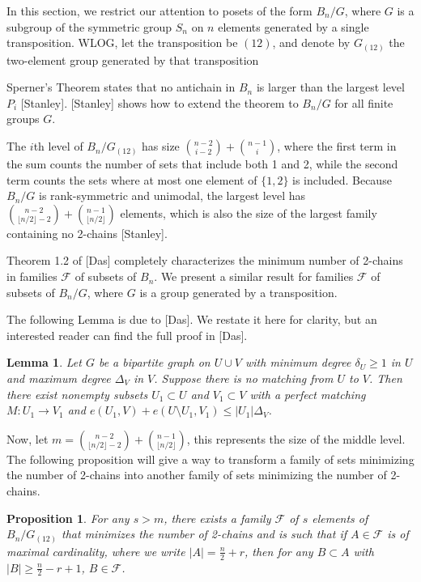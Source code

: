 \documentclass[12pt]{article}
\theoremstyle{plain}
\newtheorem{lemma}[theorem]{Lemma}
\newtheorem{proposition}[theorem]{Proposition}
\theoremstyle{definition}
\theoremstyle{remark}
\newcommand{\F}{\mathcal{F}}
\begin{document}
In this section, we restrict our attention to posets of the form $B_n / G$, where $G$ is a subgroup of the symmetric group $S_n$ on $n$ elements generated by a single transposition. WLOG, let the transposition be $(12)$, and denote by $G_{(12)}$ the two-element group generated by that transposition

Sperner's Theorem states that no antichain in $B_n$ is larger than the largest level $P_i$ [Stanley]. [Stanley] shows how to extend the theorem to $B_n / G$ for all finite groups $G$. 

The $i$th level of $B_n / G_{(12)}$ has size $\binom{n-2}{i-2} + \binom{n-1}{i}$, where the first term in the sum counts the number of sets that include both 1 and 2, while the second term counts the sets where at most one element of $\{1,2\}$ is included. Because $B_n / G$ is rank-symmetric and unimodal, the largest level has $\binom{n-2}{\lfloor n/2 \rfloor -2} + \binom{n-1}{\lfloor n/2 \rfloor}$ elements, which is also the size of the largest family containing no 2-chains [Stanley].


Theorem 1.2 of [Das] completely characterizes the minimum number of 2-chains in families $\F$ of subsets of $B_n$. We present a similar result for families $\F$ of subsets of $B_n / G$, where $G$ is a group generated by a transposition.


The following Lemma is due to [Das]. We restate it here for clarity, but an interested reader can find the full proof in [Das].

\begin{lemma}
\label{lemma2}
Let $G$ be a bipartite graph on $U \cup V$ with minimum degree $\delta_U \geq 1$ in $U$ and maximum degree $\Delta_V$ in $V$. Suppose there is no matching from $U$ to $V$. Then there exist nonempty subsets $U_1 \subset U$ and $V_1 \subset V$ with a perfect matching $M: U_1 \to V_1$ and $e(U_1,V) + e(U \setminus U_1,V_1) \leq |U_1| \Delta_V$.
\end{lemma}

Now, let $m = \binom{n-2}{\lfloor n/2 \rfloor -2} + \binom{n-1}{\lfloor n/2 \rfloor}$, this represents the size of the middle level. The following proposition will give a way to transform a family of sets minimizing the number of 2-chains into another family of sets minimizing the number of 2-chains. 

\begin{proposition}
\label{proposition1} For any $s > m$, there exists a family $\F$ of $s$ elements of $B_n / G_{(12)}$ that minimizes the number of 2-chains and is such that if $A \in \F$ is of maximal cardinality, where we write $|A| = \frac{n}{2}+r$, then for any $B \subset A$ with $|B| \geq \frac{n}{2} - r + 1$, $B \in \F$.
\end{proposition}
\end{document}
